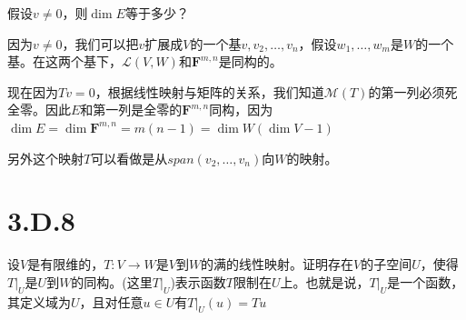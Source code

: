 \documentclass[10pt,a4paper,UTF8]{article}
\begin{document}
\begin{problem}
假设\(v\neq 0\)，则\(\dim E\)等于多少？
\end{problem}

\begin{answer}
因为\(v\neq 0\)，我们可以把\(v\)扩展成\(V\)的一个基\(v,v_{2},\ldots ,v_{n}\)，假设\(w_{1},\ldots ,w_{m}\)是\(W\)的一个基。在这两个基下，\(\mathcal{L}(V,W)\)和\(\mathbf{F}^{m,n}\)是同构的。

现在因为\(Tv = 0\)，根据线性映射与矩阵的关系，我们知道\(\mathcal{M}(T)\)的第一列必须死全零。因此\(E\)和第一列是全零的\(\mathbf{F}^{m,n}\)同构，因为\(\dim E = \dim \mathbf{F}^{m,n} = m(n-1) = \dim W (\dim V -1)\)

另外这个映射\(T\)可以看做是从\(span(v_{2},\ldots ,v_{n})\)向\(W\)的映射。
\end{answer}

\section{3.D.8}
\label{sec:orgbf2904d}


\begin{problem}
设\(V\)是有限维的，\(T:V\rightarrow W\)是\(V\)到\(W\)的满的线性映射。证明存在\(V\)的子空间\(U\)，使得\(T|_{U}\)是\(U\)到\(W\)的同构。(这里\(T|_{U}\))表示函数\(T\)限制在\(U\)上。也就是说，\(T|_{U}\)是一个函数，其定义域为\(U\)，且对任意\(u\in U\)有\(T|_{U}(u) = Tu\)
\end{problem}
\end{document}
